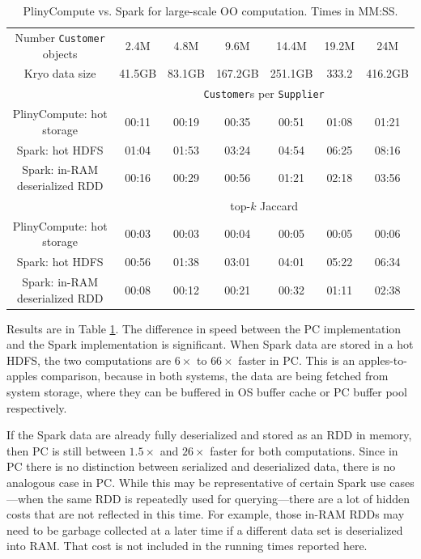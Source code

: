 \begin{table}[h!]
\begin{center}
\begin{tabular}{|c||c|c|c|c|c|c|}
\hline
Number \texttt{Customer} objects &2.4M & 4.8M & 9.6M  & 14.4M & 19.2M & 24M \\
Kryo data size &41.5GB & 83.1GB & 167.2GB &251.1GB &333.2 &416.2GB \\
\hline
& \multicolumn{6}{c|}{\texttt{Customer}s per \texttt{Supplier}} \\
\hline
PlinyCompute: hot storage & 00:11&	00:19&	00:35&	00:51&	01:08&	01:21 \\
Spark: hot HDFS & 01:04&	01:53&	03:24&	04:54&	06:25&	08:16\\
Spark: in-RAM deserialized RDD & 00:16& 	00:29& 	00:56& 	01:21& 	02:18& 	03:56\\
\hline
& \multicolumn{6}{c|}{top-$k$ Jaccard} \\
\hline
PlinyCompute: hot storage & 00:03&	00:03&	00:04&	00:05&	00:05&	00:06 \\
Spark: hot HDFS & 00:56&	01:38&	03:01 & 04:01&	05:22&	06:34\\
Spark: in-RAM deserialized RDD & 00:08& 	00:12& 	00:21 & 00:32& 	01:11& 	02:38\\
\hline
\end{tabular}
\caption{PlinyCompute vs. Spark for large-scale OO computation. Times in MM:SS.}
\label{fig:TPC}
\end{center}
\end{table}

Results are in Table \ref{fig:TPC}.  The difference in speed between the PC implementation and the Spark implementation
is significant.
When Spark data
are stored in
a hot HDFS, the two computations are $6\times$ to $66\times$ faster in PC.  
This is an apples-to-apples comparison, because in both systems, the data are being fetched from system storage, where they
can be buffered in OS buffer cache or PC buffer pool respectively.

If the Spark data are already
fully deserialized and stored as an RDD in memory, then PC is still 
between $1.5\times$ and $26\times$ faster
for both computations.
Since in PC there is no distinction between serialized and deserialized data, there is no analogous case in PC.  While this
may be representative of certain Spark use cases---when the same RDD is repeatedly used for querying---there are a lot of
hidden costs that are not reflected in this time.  For example, those in-RAM RDDs may need to be garbage collected at a later
time if a different data set is deserialized into RAM.  That cost is not included in the running times reported here.

